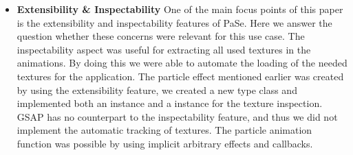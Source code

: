 \begin{itemize}
\item \textbf{Extensibility \& Inspectability} One of the main focus points of this paper is the extensibility and inspectability features of PaSe. Here we answer the question whether these concerns were relevant for this use case. The inspectability aspect was useful for extracting all used textures in the animations. By doing this we were able to automate the loading of the needed textures for the application. The particle effect mentioned earlier was created by using the extensibility feature, we created a new  type class and implemented both an  instance and a  instance for the texture inspection. GSAP has no counterpart to the inspectability feature, and thus we did not implement the automatic tracking of textures. The particle animation function was possible by using implicit arbitrary effects and callbacks.
\end{itemize}
